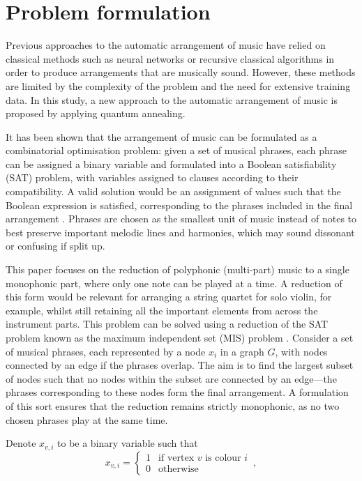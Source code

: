 \documentclass[12pt]{article}
\begin{document}
\section{Problem formulation}

Previous approaches to the automatic arrangement of music have relied on classical methods such as neural networks  or recursive classical algorithms  in order to produce arrangements that are musically sound. However, these methods are limited by the complexity of the problem and the need for extensive training data. In this study, a new approach to the automatic arrangement of music is proposed by applying quantum annealing.

It has been shown that the arrangement of music can be formulated as a combinatorial optimisation problem: given a set of musical phrases, each phrase can be assigned a binary variable and formulated into a Boolean satisfiability (SAT) problem, with variables assigned to clauses according to their compatibility. A valid solution would be an assignment of values such that the Boolean expression is satisfied, corresponding to the phrases included in the final arrangement . Phrases are chosen as the smallest unit of music instead of notes to best preserve important melodic lines and harmonies, which may sound dissonant or confusing if split up.

This paper focuses on the reduction of polyphonic (multi-part) music to a single monophonic part, where only one note can be played at a time. A reduction of this form would be relevant for arranging a string quartet for solo violin, for example, whilst still retaining all the important elements from across the instrument parts. This problem can be solved using a reduction of the SAT problem known as the maximum independent set (MIS) problem . Consider a set of musical phrases, each represented by a node $x_i$ in a graph $G$, with nodes connected by an edge if the phrases overlap. The aim is to find the largest subset of nodes such that no nodes within the subset are connected by an edge—the phrases corresponding to these nodes form the final arrangement. A formulation of this sort ensures that the reduction remains strictly monophonic, as no two chosen phrases play at the same time.

Denote $x_{v,i}$ to be a binary variable such that
\begin{equation}
    x_{v,i} =
    \begin{cases}
        1 & \text{if vertex $v$ is colour $i$} \\
        0 & \text{otherwise}
    \end{cases}
    \,,
\end{equation}
\end{document}
